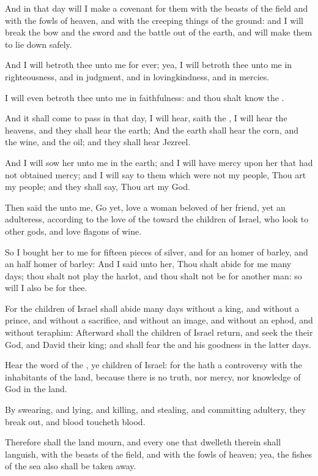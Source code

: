 \Verse And in that day will I make a covenant for them with the beasts of the field and with the fowls of heaven, and with the creeping things of the ground: and I will break the bow and the sword and the battle out of the earth, and will make them to lie down safely.

\Verse And I will betroth thee unto me for ever; yea, I will betroth thee unto me in righteousness, and in judgment, and in lovingkindness, and in mercies.

\Verse I will even betroth thee unto me in faithfulness: and thou shalt know the \LORD.

\Verse And it shall come to pass in that day, I will hear, saith the \LORD, I will hear the heavens, and they shall hear the earth; \Verse And the earth shall hear the corn, and the wine, and the oil; and they shall hear Jezreel.

\Verse And I will sow her unto me in the earth; and I will have mercy upon her that had not obtained mercy; and I will say to them which were not my people, Thou art my people; and they shall say, Thou art my God.


\Chapter
\Verse Then said the \LORD unto me, Go yet, love a woman beloved of her friend, yet an adulteress, according to the love of the \LORD toward the children of Israel, who look to other gods, and love flagons of wine.

\Verse So I bought her to me for fifteen pieces of silver, and for an homer of barley, and an half homer of barley: \Verse And I said unto her, Thou shalt abide for me many days; thou shalt not play the harlot, and thou shalt not be for another man: so will I also be for thee.

\Verse For the children of Israel shall abide many days without a king, and without a prince, and without a sacrifice, and without an image, and without an ephod, and without teraphim: \Verse Afterward shall the children of Israel return, and seek the \LORD their God, and David their king; and shall fear the \LORD and his goodness in the latter days.


\Chapter
\Verse Hear the word of the \LORD, ye children of Israel: for the \LORD hath a controversy with the inhabitants of the land, because there is no truth, nor mercy, nor knowledge of God in the land.

\Verse By swearing, and lying, and killing, and stealing, and committing adultery, they break out, and blood toucheth blood.

\Verse Therefore shall the land mourn, and every one that dwelleth therein shall languish, with the beasts of the field, and with the fowls of heaven; yea, the fishes of the sea also shall be taken away.

